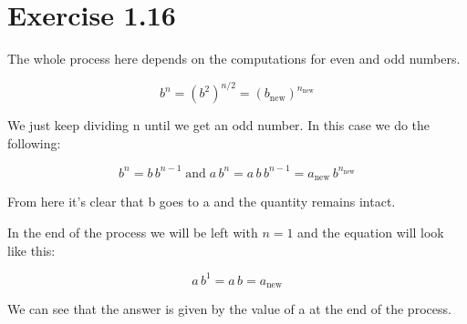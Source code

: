 \section*{Exercise 1.16}

The whole process here depends on the computations for even and odd numbers.

\begin{equation}
	b^n = \left(b^2\right)^{n/2} = \left(b_{\text{new}}\right)^{n_{\text{new}}}
\end{equation}

We just keep dividing n until we get an odd number. In this case we do the following:

\begin{equation}
	b^n = b\,b^{n-1} \; \text{and} \; a\,b^n = a\,b\,b^{n-1} = a_{\text{new}}\,b^{n_{\text{new}}}
\end{equation}

From here it's clear that b goes to a and the quantity remains intact.

In the end of the process we will be left with $n=1$ and the equation will look like this:

\begin{equation}
	a\,b^1 = a\,b = a_{\text{new}}
\end{equation}

We can see that the answer is given by the value of a at the end of the process.
